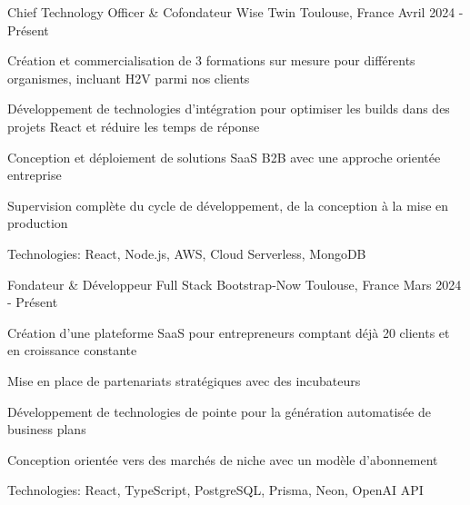 


\begin{cventries}


\cventry
{Chief Technology Officer \& Cofondateur} %
{Wise Twin} %
{Toulouse, France} %
{Avril 2024 - Présent} %
{ %
\begin{cvitems}
\item {Création et commercialisation de 3 formations sur mesure pour différents organismes, incluant H2V parmi nos clients}
\item {Développement de technologies d'intégration pour optimiser les builds dans des projets React et réduire les temps de réponse}
\item {Conception et déploiement de solutions SaaS B2B avec une approche orientée entreprise}
\item {Supervision complète du cycle de développement, de la conception à la mise en production}
\item {Technologies: React, Node.js, AWS, Cloud Serverless, MongoDB}
\end{cvitems}
}
\vspace{1.5em}


\cventry
{Fondateur \& Développeur Full Stack} %
{Bootstrap-Now} %
{Toulouse, France} %
{Mars 2024 - Présent} %
{ %
\begin{cvitems}
\item {Création d'une plateforme SaaS pour entrepreneurs comptant déjà 20 clients et en croissance constante}
\item {Mise en place de partenariats stratégiques avec des incubateurs}
\item {Développement de technologies de pointe pour la génération automatisée de business plans}
\item {Conception orientée vers des marchés de niche avec un modèle d'abonnement}
\item {Technologies: React, TypeScript, PostgreSQL, Prisma, Neon, OpenAI API}
\end{cvitems}
}
\vspace{1.5em}


\end{cventries}
